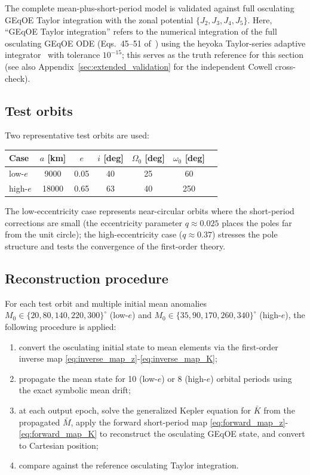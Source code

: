 \documentclass[11pt]{article}
\begin{document}
The complete mean-plus-short-period model is validated against full osculating
GEqOE Taylor integration with the zonal potential $\{J_2, J_3, J_4, J_5\}$.
Here, ``GEqOE Taylor integration'' refers to the numerical integration of
the full osculating GEqOE ODE (Eqs.~45--51 of~\cite{bau2021}) using the
heyoka Taylor-series adaptive integrator~\cite{biscani2021} with tolerance
$10^{-15}$; this serves as the truth reference for this section (see also
Appendix~\ref{sec:extended_validation} for the independent Cowell cross-check).

\subsection{Test orbits}

Two representative test orbits are used:
\begin{center}
\begin{tabular}{lcccccc}
\toprule
Case & $a$ [km] & $e$ & $i$ [deg] & $\Omega_0$ [deg] & $\omega_0$ [deg] \\
\midrule
low-$e$ & 9000 & 0.05 & 40 & 25 & 60 \\
high-$e$ & 18000 & 0.65 & 63 & 40 & 250 \\
\bottomrule
\end{tabular}
\end{center}
The low-eccentricity case represents near-circular orbits where the
short-period corrections are small (the eccentricity parameter $q \approx 0.025$
places the poles far from the unit circle); the high-eccentricity case
($q \approx 0.37$) stresses the pole structure and tests the convergence of
the first-order theory.

\subsection{Reconstruction procedure}

For each test orbit and multiple initial mean anomalies
$M_0 \in \{20, 80, 140, 220, 300\}^\circ$ (low-$e$) and
$M_0 \in \{35, 90, 170, 260, 340\}^\circ$ (high-$e$), the following
procedure is applied:
\begin{enumerate}
    \item convert the osculating initial state to mean elements via the
    first-order inverse map \eqref{eq:inverse_map_z}-\eqref{eq:inverse_map_K};
    \item propagate the mean state for 10 (low-$e$) or 8 (high-$e$) orbital
    periods using the exact symbolic mean drift;
    \item at each output epoch, solve the generalized Kepler equation for
    $\bar K$ from the propagated $\bar M$, apply the forward short-period map
    \eqref{eq:forward_map_z}-\eqref{eq:forward_map_K} to reconstruct the
    osculating GEqOE state, and convert to Cartesian position;
    \item compare against the reference osculating Taylor integration.
\end{enumerate}
\end{document}
